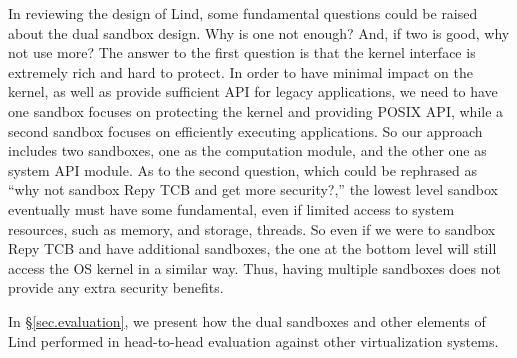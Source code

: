 In reviewing the design of Lind, some fundamental questions could be raised about the dual sandbox design. 
Why is one not enough? And, if two is good, why not use more? 
The answer to the first question is that the kernel interface is extremely rich and hard to protect. 
In order to have minimal impact on the kernel, as well as provide sufficient API for legacy applications, 
we need to have one sandbox focuses on protecting the kernel and providing POSIX API, 
while a second sandbox focuses on efficiently executing applications. 
So our approach includes two sandboxes, one as the computation module, 
and the other one as system API module. As to the second question, 
which could be rephrased as ``why not sandbox Repy TCB and get more security?,'' 
the lowest level sandbox eventually must have some fundamental, 
even if  limited access to system resources, such as memory, and storage, threads. 
So even if we were to sandbox Repy TCB and have additional sandboxes, 
the one at the bottom level will still access the OS kernel in a similar way. 
Thus, having multiple sandboxes does not provide any extra security benefits. 

In \S{\ref{sec.evaluation}}, we present how the dual sandboxes and other elements of Lind performed in 
head-to-head evaluation against other virtualization systems.